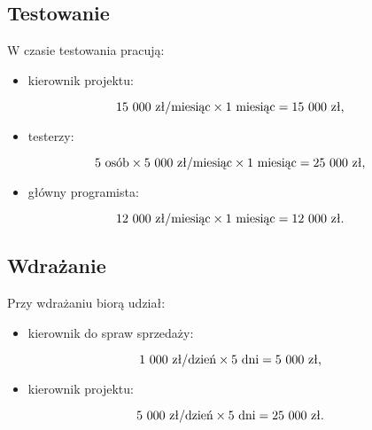 \documentclass [11pt, a4paper, leqno] {article}
\begin{document}
\subsection{Testowanie}
\noindent
W czasie testowania pracują:

\begin{itemize}
\item kierownik projektu: 
\end{itemize}
\begin{equation} 15\\\ 000 \text{ zł/miesiąc} \times 1 \text{ miesiąc} = 15\\\ 000 \text{ zł,} \end{equation}

\begin{itemize}
\item testerzy: 
\end{itemize}
\begin{equation}5 \text{ osób} \times 5\\\ 000 \text{ zł/miesiąc} \times 1 \text{ miesiąc} = 25\\\ 000 \text{ zł,} \end{equation}

\begin{itemize}
\item główny programista: 
\end{itemize}
\begin{equation}12\\\ 000 \text{ zł/miesiąc} \times 1 \text{ miesiąc} = 12\\\ 000 \text{ zł.} \end{equation}

\subsection{Wdrażanie}
\noindent
Przy wdrażaniu biorą udział:

\begin{itemize}
\item kierownik do spraw sprzedaży: 
\end{itemize}
\begin{equation}1\\\ 000 \text{ zł/dzień} \times 5 \text{ dni} = 5\\\ 000 \text{ zł,} \end{equation}

\begin{itemize}
\item kierownik projektu: 
\end{itemize}
\begin{equation}5\\\ 000 \text{ zł/dzień} \times 5 \text{ dni} = 25\\\ 000 \text{ zł.} \end{equation}
\end{document}
